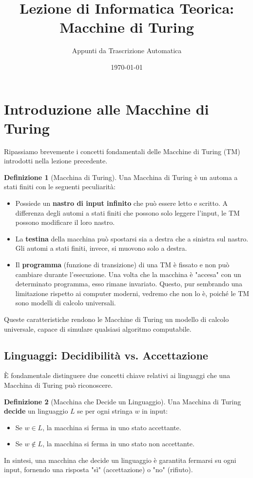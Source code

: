 \documentclass[a4paper]{article}
\title{Lezione di Informatica Teorica: Macchine di Turing}
\author{Appunti da Trascrizione Automatica}
\date{\today}
\theoremstyle{definition} %
\newtheorem{definition}{Definizione}
\begin{document}
\maketitle
\tableofcontents
\newpage

\section{Introduzione alle Macchine di Turing}

Ripassiamo brevemente i concetti fondamentali delle Macchine di Turing (TM) introdotti nella lezione precedente.

\begin{definition}[Macchina di Turing]
Una Macchina di Turing è un automa a stati finiti con le seguenti peculiarità:
\begin{itemize}
    \item Possiede un \textbf{nastro di input infinito} che può essere letto e scritto. A differenza degli automi a stati finiti che possono solo leggere l'input, le TM possono modificare il loro nastro.
    \item La \textbf{testina} della macchina può spostarsi sia a destra che a sinistra sul nastro. Gli automi a stati finiti, invece, si muovono solo a destra.
    \item Il \textbf{programma} (funzione di transizione) di una TM è fissato e non può cambiare durante l'esecuzione. Una volta che la macchina è "accesa" con un determinato programma, esso rimane invariato. Questo, pur sembrando una limitazione rispetto ai computer moderni, vedremo che non lo è, poiché le TM sono modelli di calcolo universali.
\end{itemize}
Queste caratteristiche rendono le Macchine di Turing un modello di calcolo universale, capace di simulare qualsiasi algoritmo computabile.
\end{definition}

\subsection{Linguaggi: Decidibilità vs. Accettazione}

È fondamentale distinguere due concetti chiave relativi ai linguaggi che una Macchina di Turing può riconoscere.

\begin{definition}[Macchina che Decide un Linguaggio]
Una Macchina di Turing \textbf{decide} un linguaggio $L$ se per ogni stringa $w$ in input:
\begin{itemize}
    \item Se $w \in L$, la macchina si ferma in uno stato accettante.
    \item Se $w \notin L$, la macchina si ferma in uno stato non accettante.
\end{itemize}
In sintesi, una macchina che decide un linguaggio è garantita fermarsi su ogni input, fornendo una risposta "sì" (accettazione) o "no" (rifiuto).
\end{definition}
\end{document}
